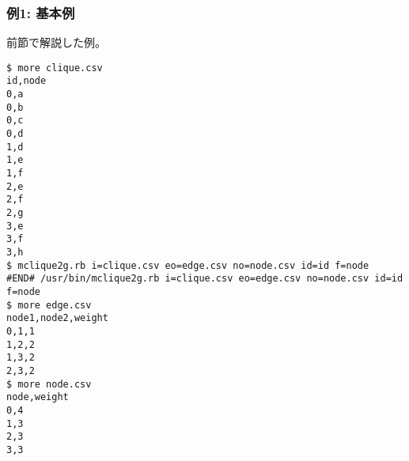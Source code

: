 \subsubsection*{例1: 基本例}

前節で解説した例。


\begin{Verbatim}[baselinestretch=0.7,frame=single]
$ more clique.csv
id,node
0,a
0,b
0,c
0,d
1,d
1,e
1,f
2,e
2,f
2,g
3,e
3,f
3,h
$ mclique2g.rb i=clique.csv eo=edge.csv no=node.csv id=id f=node
#END# /usr/bin/mclique2g.rb i=clique.csv eo=edge.csv no=node.csv id=id f=node
$ more edge.csv
node1,node2,weight
0,1,1
1,2,2
1,3,2
2,3,2
$ more node.csv
node,weight
0,4
1,3
2,3
3,3
\end{Verbatim}
